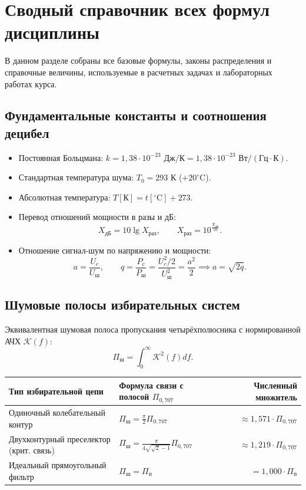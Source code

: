 \documentclass[12pt,a4paper]{article}
\begin{document}
\newpage
\section{Сводный справочник всех формул дисциплины}

В данном разделе собраны все базовые формулы, законы распределения и справочные величины, используемые в расчетных задачах и лабораторных работах курса.

\subsection{Фундаментальные константы и соотношения децибел}
\begin{itemize}
    \item Постоянная Больцмана: $k = 1{,}38 \cdot 10^{-23}\text{ Дж/К} = 1{,}38 \cdot 10^{-23}\text{ Вт}/(\text{Гц}\cdot\text{К})$.
    \item Стандартная температура шума: $T_0 = 293\text{ К}$ ($+20^\circ\text{C}$).
    \item Абсолютная температура: $T [\text{К}] = t [^\circ\text{C}] + 273$.
    \item Перевод отношений мощности в разы и дБ:
    \begin{equation}
    X_{\text{дБ}} = 10 \lg X_{\text{раз}}, \qquad X_{\text{раз}} = 10^{\frac{X_{\text{дБ}}}{10}}.
    \end{equation}
    \item Отношение сигнал-шум по напряжению и мощности:
    \begin{equation}
    a = \frac{U_c}{U_{\text{ш}}}, \qquad q = \frac{P_c}{P_{\text{ш}}} = \frac{U_c^2 / 2}{U_{\text{ш}}^2} = \frac{a^2}{2} \implies a = \sqrt{2q}.
    \end{equation}
\end{itemize}

\subsection{Шумовые полосы избирательных систем}
Эквивалентная шумовая полоса пропускания четырёхполюсника с нормированной АЧХ $\mathcal{K}(f)$:
\begin{equation}
\Pi_{\text{ш}} = \int_0^\infty \mathcal{K}^2(f) df.
\end{equation}
\begin{center}
\begin{tabular}{llr}
\toprule
\textbf{Тип избирательной цепи} & \textbf{Формула связи с полосой $\Pi_{0{,}707}$} & \textbf{Численный множитель} \\
\midrule
Одиночный колебательный контур & $\Pi_{\text{ш}} = \frac{\pi}{2} \Pi_{0{,}707}$ & $\approx 1{,}571 \cdot \Pi_{0{,}707}$ \\
Двухконтурный преселектор (крит. связь) & $\Pi_{\text{ш}} = \frac{\pi}{4\sqrt{\sqrt{2}-1}} \Pi_{0{,}707}$ & $\approx 1{,}219 \cdot \Pi_{0{,}707}$ \\
Идеальный прямоугольный фильтр & $\Pi_{\text{ш}} = \Pi_{\text{п}}$ & $= 1{,}000 \cdot \Pi_{\text{п}}$ \\
\bottomrule
\end{tabular}
\end{center}
\end{document}
